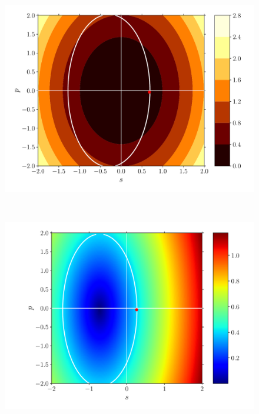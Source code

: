 \documentclass[fleqn]{goose-article}
\begin{document}
\begin{figure}[htp]
\begin{minipage}[t]{.31\textwidth}
        \centering
        \includegraphics[width=\textwidth]{prestress_0_phase-diagram_energy-contour.pdf}
        \label{fig:}
    \end{minipage}
    \\
    \begin{minipage}[t]{.31\textwidth}
        \centering
        \includegraphics[width=\textwidth]{prestress_1_phase-diagram_eps.pdf}
        \subcaption{$\varepsilon$}
        \label{fig:}
    \end{minipage}
    \hfill
    \begin{minipage}[t]{.31\textwidth}
        \centering

\end{minipage}
\end{figure}
\end{document}
